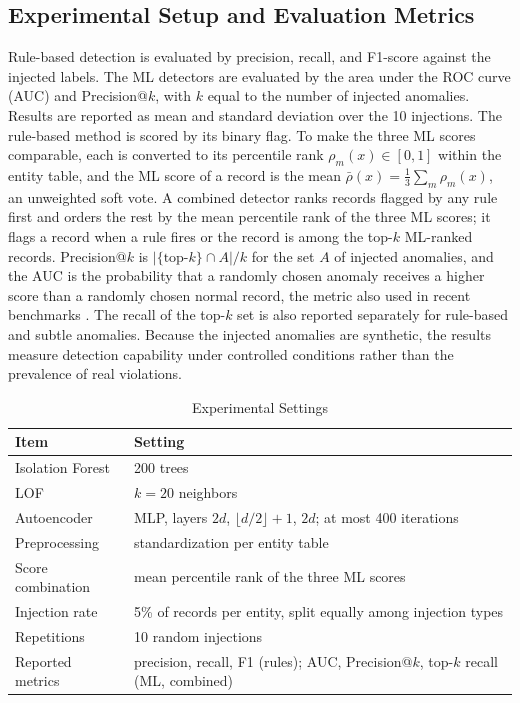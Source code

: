 \documentclass[conference]{IEEEtran}
\begin{document}
\subsection{Experimental Setup and Evaluation Metrics}
Rule-based detection is evaluated by precision, recall, and F1-score against the injected labels. The ML detectors are evaluated by the area under the ROC curve (AUC) and Precision@$k$, with $k$ equal to the number of injected anomalies. Results are reported as mean and standard deviation over the 10 injections. The rule-based method is scored by its binary flag. To make the three ML scores comparable, each is converted to its percentile rank $\rho_m(x)\in[0,1]$ within the entity table, and the ML score of a record is the mean $\bar{\rho}(x)=\frac{1}{3}\sum_{m}\rho_m(x)$, an unweighted soft vote. A combined detector ranks records flagged by any rule first and orders the rest by the mean percentile rank of the three ML scores; it flags a record when a rule fires or the record is among the top-$k$ ML-ranked records. Precision@$k$ is $|\{\text{top-}k\}\cap A|/k$ for the set $A$ of injected anomalies, and the AUC is the probability that a randomly chosen anomaly receives a higher score than a randomly chosen normal record, the metric also used in recent benchmarks \cite{han2022adbench}. The recall of the top-$k$ set is also reported separately for rule-based and subtle anomalies. Because the injected anomalies are synthetic, the results measure detection capability under controlled conditions rather than the prevalence of real violations.


\begin{table}[htbp]
\caption{Experimental Settings}
\begin{center}
\begin{tabular}{L{0.34\columnwidth}L{0.54\columnwidth}}
\toprule
\textbf{Item} & \textbf{Setting} \\
\midrule
Isolation Forest & 200 trees \\
LOF & $k=20$ neighbors \\
Autoencoder & MLP, layers $2d$, $\lfloor d/2\rfloor+1$, $2d$; at most 400 iterations \\
Preprocessing & standardization per entity table \\
Score combination & mean percentile rank of the three ML scores \\
Injection rate & 5\% of records per entity, split equally among injection types \\
Repetitions & 10 random injections \\
Reported metrics & precision, recall, F1 (rules); AUC, Precision@$k$, top-$k$ recall (ML, combined) \\
\bottomrule
\end{tabular}
\label{tab:settings}
\end{center}
\end{table}
\end{document}
